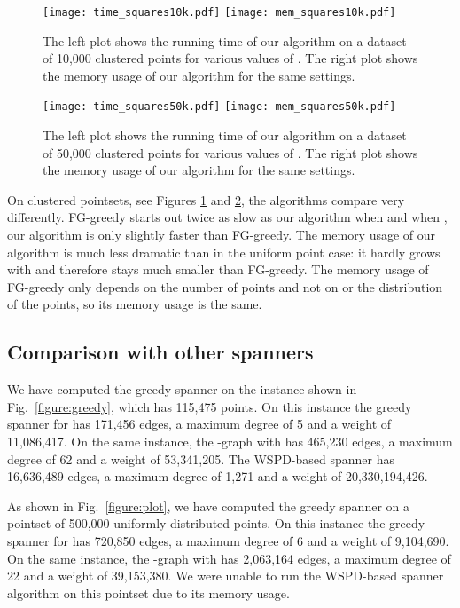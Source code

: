 \documentclass[runningheads,envcountsame,oribibl,orivec]{llncs}
\begin{document}
\begin{figure}[h!]\centering
\texttt{[image: time\_squares10k.pdf]}
\texttt{[image: mem\_squares10k.pdf]}
\caption{The left plot shows the running time of our algorithm on a dataset of 10,000 clustered points for various values of . The right plot shows the memory usage of our algorithm for the same settings.}
\label{figure:clusteredplot1}
\end{figure}

\begin{figure}[h!]\centering
\texttt{[image: time\_squares50k.pdf]}
\texttt{[image: mem\_squares50k.pdf]}
\caption{The left plot shows the running time of our algorithm on a dataset of 50,000 clustered points for various values of . The right plot shows the memory usage of our algorithm for the same settings.}
\label{figure:clusteredplot2}
\end{figure}

On clustered pointsets, see Figures \ref{figure:clusteredplot1} and \ref{figure:clusteredplot2}, the algorithms compare very differently. FG-greedy starts out twice as slow as our algorithm when  and when , our algorithm is only slightly faster than FG-greedy. The memory usage of our algorithm is much less dramatic than in the uniform point case: it hardly grows with  and therefore stays much smaller than FG-greedy. The memory usage of FG-greedy only depends on the number of points and not on  or the distribution of the points, so its memory usage is the same.

\subsection{Comparison with other spanners}

We have computed the greedy spanner on the instance shown in Fig.~\ref{figure:greedy}, which has 115,475 points. On this instance the greedy spanner for  has 171,456 edges, a maximum degree of 5 and a weight of 11,086,417. On the same instance, the -graph with  has 465,230 edges, a maximum degree of 62 and a weight of 53,341,205. The WSPD-based spanner has 16,636,489 edges, a maximum degree of 1,271 and a weight of 20,330,194,426.

As shown in Fig.~\ref{figure:plot}, we have computed the greedy spanner on a pointset of 500,000 uniformly distributed points. On this instance the greedy spanner for  has 720,850 edges, a maximum degree of 6 and a weight of 9,104,690. On the same instance, the -graph with  has 2,063,164 edges, a maximum degree of 22 and a weight of 39,153,380. We were unable to run the WSPD-based spanner algorithm on this pointset due to its memory usage.
\end{document}
